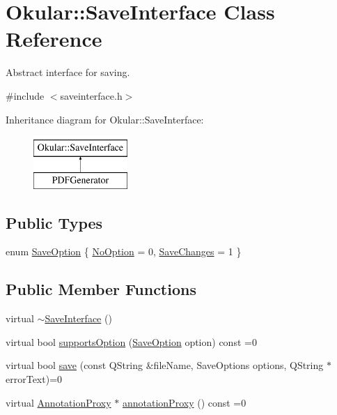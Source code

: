 \hypertarget{classOkular_1_1SaveInterface}{\section{Okular\+:\+:Save\+Interface Class Reference}
\label{classOkular_1_1SaveInterface}
}


Abstract interface for saving.  




{\ttfamily \#include $<$saveinterface.\+h$>$}

Inheritance diagram for Okular\+:\+:Save\+Interface\+:\begin{figure}[H]
\begin{center}
\leavevmode
\includegraphics[height=2.000000cm]{classOkular_1_1SaveInterface}
\end{center}
\end{figure}
\subsection*{Public Types}
\begin{DoxyCompactItemize}
\item 
enum \hyperlink{classOkular_1_1SaveInterface_ada9624051ff917ec66ca12b6d6684399}{Save\+Option} \{ \hyperlink{classOkular_1_1SaveInterface_ada9624051ff917ec66ca12b6d6684399afbd2f94c91a2abc35712e702480a068d}{No\+Option} = 0, 
\hyperlink{classOkular_1_1SaveInterface_ada9624051ff917ec66ca12b6d6684399a595c02ea3ea3f3c841cdf3b7a0824d68}{Save\+Changes} = 1
 \}
\end{DoxyCompactItemize}
\subsection*{Public Member Functions}
\begin{DoxyCompactItemize}
\item 
virtual \hyperlink{classOkular_1_1SaveInterface_aa5bbe978abb42a9672463ce3eccf1d1e}{$\sim$\+Save\+Interface} ()
\item 
virtual bool \hyperlink{classOkular_1_1SaveInterface_a8015ceb5e3b6dffc5f7cd620a82fdc16}{supports\+Option} (\hyperlink{classOkular_1_1SaveInterface_ada9624051ff917ec66ca12b6d6684399}{Save\+Option} option) const =0
\item 
virtual bool \hyperlink{classOkular_1_1SaveInterface_a5a417719832a6c6fc245e305b6b64268}{save} (const Q\+String \&file\+Name, Save\+Options options, Q\+String $\ast$error\+Text)=0
\item 
virtual \hyperlink{classOkular_1_1AnnotationProxy}{Annotation\+Proxy} $\ast$ \hyperlink{classOkular_1_1SaveInterface_a1fdb82695d9758e9e68ab0129bf16237}{annotation\+Proxy} () const =0
\end{DoxyCompactItemize}


